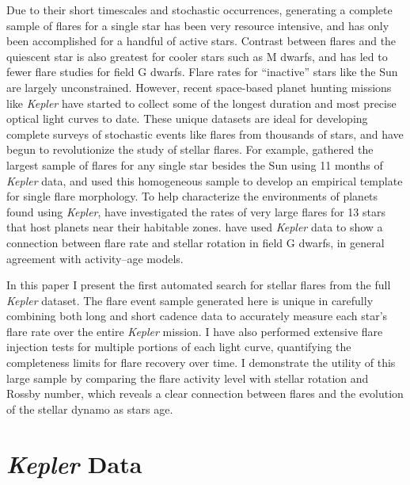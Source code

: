 \documentclass[twocolumn]{aastex6}
\newcommand{\Kepler}{\textsl{Kepler}\xspace}
\begin{document}
Due to their short timescales and stochastic occurrences, generating a complete sample of flares for a single star has been very resource intensive, and has only been accomplished for a handful of active stars. Contrast between flares and the quiescent star is also greatest for cooler stars such as M dwarfs, and has led to fewer flare studies for field G dwarfs. Flare rates for ``inactive'' stars like the Sun are largely unconstrained. However, recent space-based planet hunting missions like \Kepler \citep{borucki2010} have started to collect some of the longest duration and most precise optical light curves to date. These unique datasets are ideal for developing complete surveys of stochastic events like flares from thousands of stars, and have begun to revolutionize the study of stellar flares. For example, \citet{davenport2014b} gathered the largest sample of flares for any single star besides the Sun using 11 months of \Kepler data, and used this homogeneous sample to develop an empirical template for single flare morphology. To help characterize the environments of planets found using \Kepler, \citet{armstrong2016} have investigated the rates of very large flares for 13 stars that host planets near their habitable zones. \citet{maehara2012} have used \Kepler data to show a connection between flare rate and stellar rotation in field G dwarfs, in general agreement with activity--age models.


In this paper I present the first automated search for stellar flares from the full \Kepler dataset. The flare event sample generated here is unique in carefully combining both long and short cadence data to accurately measure each star's flare rate over the entire \Kepler mission. I have also performed extensive flare injection tests for multiple portions of each light curve, quantifying the completeness limits for flare recovery over time. I demonstrate the utility of this large sample by comparing the flare activity level with stellar rotation and Rossby number, which reveals a clear connection between flares and the evolution of the stellar dynamo as stars age.


\section{{\it Kepler} Data}
\label{sec:data}
\end{document}
